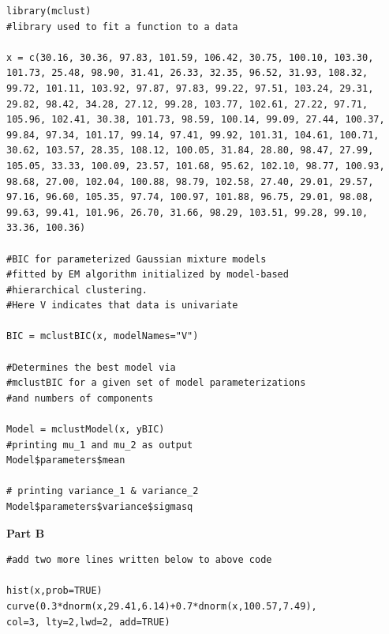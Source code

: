 \documentclass[12pt,a4paper]{report}
\begin{document}
\begin{lstlisting}
library(mclust)
#library used to fit a function to a data

x = c(30.16, 30.36, 97.83, 101.59, 106.42, 30.75, 100.10, 103.30, 
101.73, 25.48, 98.90, 31.41, 26.33, 32.35, 96.52, 31.93, 108.32, 
99.72, 101.11, 103.92, 97.87, 97.83, 99.22, 97.51, 103.24, 29.31, 
29.82, 98.42, 34.28, 27.12, 99.28, 103.77, 102.61, 27.22, 97.71, 
105.96, 102.41, 30.38, 101.73, 98.59, 100.14, 99.09, 27.44, 100.37, 
99.84, 97.34, 101.17, 99.14, 97.41, 99.92, 101.31, 104.61, 100.71, 
30.62, 103.57, 28.35, 108.12, 100.05, 31.84, 28.80, 98.47, 27.99, 
105.05, 33.33, 100.09, 23.57, 101.68, 95.62, 102.10, 98.77, 100.93, 
98.68, 27.00, 102.04, 100.88, 98.79, 102.58, 27.40, 29.01, 29.57, 
97.16, 96.60, 105.35, 97.74, 100.97, 101.88, 96.75, 29.01, 98.08, 
99.63, 99.41, 101.96, 26.70, 31.66, 98.29, 103.51, 99.28, 99.10, 
33.36, 100.36)

#BIC for parameterized Gaussian mixture models 
#fitted by EM algorithm initialized by model-based
#hierarchical clustering.
#Here V indicates that data is univariate

BIC = mclustBIC(x, modelNames="V")

#Determines the best model via 
#mclustBIC for a given set of model parameterizations
#and numbers of components

Model = mclustModel(x, yBIC)
#printing mu_1 and mu_2 as output
Model$parameters$mean

# printing variance_1 & variance_2
Model$parameters$variance$sigmasq
\end{lstlisting}
\textbf{Part B}
\begin{lstlisting}
#add two more lines written below to above code

hist(x,prob=TRUE)
curve(0.3*dnorm(x,29.41,6.14)+0.7*dnorm(x,100.57,7.49), 
col=3, lty=2,lwd=2, add=TRUE)
\end{lstlisting}
\end{document}
